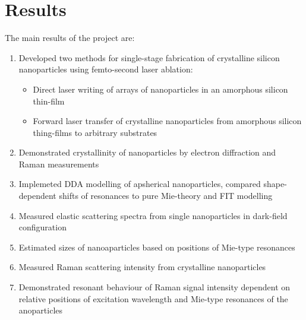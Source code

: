 \section*{Results}
    The main results of the project are:

    \begin{enumerate}
        \item Developed two methods for single-stage fabrication of crystalline silicon nanoparticles using femto-second laser ablation:
            \begin{itemize}
                \item Direct laser writing of arrays of nanoparticles in an amorphous silicon thin-film
                \item Forward laser transfer of crystalline nanoparticles from amorphous silicon thing-films to arbitrary substrates
            \end{itemize}
        \item Demonstrated crystallinity of nanoparticles by electron diffraction and Raman measurements
        \item Implemeted DDA modelling of apsherical nanoparticles, compared shape-dependent shifts of resonances to pure Mie-theory
            and FIT modelling
        \item Measured elastic scattering spectra from single nanoparticles in dark-field configuration
        \item Estimated sizes of nanoaparticles based on positions of Mie-type resonances
        \item Measured Raman scattering intensity from crystalline nanoparticles
        \item Demonstrated resonant behaviour of Raman signal intensity dependent on relative positions of excitation wavelength and Mie-type resonances
            of the anoparticles
    \end{enumerate}


